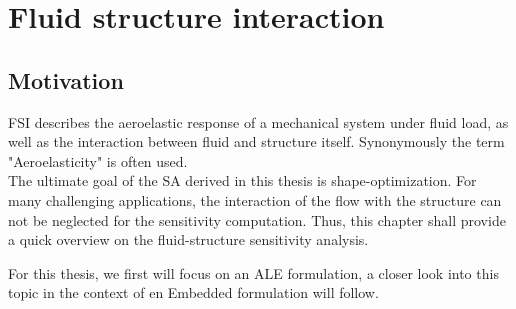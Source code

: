 \documentclass[../main.tex]{subfiles}
\begin{document}
\setlength{\delimitershortfall}{0pt}
\chapter{Fluid structure interaction}
\minitoc

\section{Motivation}
\acf{FSI} describes the aeroelastic response of a mechanical system under fluid load, as well as the interaction between fluid and structure itself. Synonymously the term "Aeroelasticity" is often used.\\
The ultimate goal of the \acf{SA} derived in this thesis is shape-optimization. For many challenging applications, the interaction of the flow with the structure can not be neglected for the sensitivity computation. Thus, this chapter shall provide a quick overview on the fluid-structure sensitivity analysis.

For this thesis, we first will focus on an \ac{ALE} formulation, a closer look into this topic in the context of en Embedded formulation will follow.\\
\end{document}
